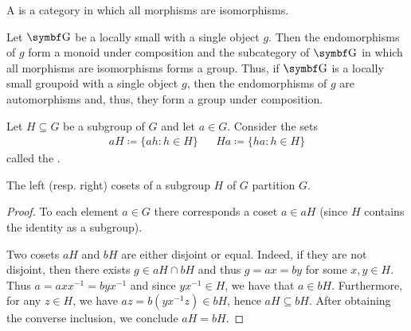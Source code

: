 \begin{definition}\label{def:groupoid}
  A  is a category in which all morphisms are isomorphisms.
\end{definition}

\begin{definition}\label{remark:groupoids}
  Let \( \Bold G \) be a locally small with a single object \( g \). Then the endomorphisms of \( g \) form a monoid under composition and the subcategory of \( \Bold G \) in which all morphisms are isomorphisms forms a group. Thus, if \( \Bold G \) is a locally small groupoid with a single object \( g \), then the endomorphisms of \( g \) are automorphisms and, thus, they form a group under composition.
\end{definition}

\begin{definition}\label{def:group_cosets}
  Let \( H \subseteq G \) be a subgroup of \( G \) and let \( a \in G \). Consider the sets
  \begin{align*}
    aH \coloneqq \{ ah \colon h \in H \}
    &&
    Ha \coloneqq \{ ha \colon h \in H \}
  \end{align*}
  called the .
\end{definition}

\begin{proposition}\label{thm:coset_partition}
  The left (resp. right) cosets of a subgroup \( H \) of \( G \) partition \( G \).
\end{proposition}
\begin{proof}
  To each element \( a \in G \) there corresponds a coset \( a \in aH \) (since \( H \) contains the identity as a subgroup).

  Two cosets \( aH \) and \( bH \) are either disjoint or equal. Indeed, if they are not disjoint, then there exists \( g \in aH \cap bH \) and thus \( g = ax = by \) for some \( x, y \in H \). Thus \( a = a x x^{-1} = b y x^{-1} \) and since \( y x^{-1} \in H \), we have that \( a \in bH \). Furthermore, for any \( z \in H \), we have \( az = b(y x^{-1} z) \in bH \), hence \( aH \subseteq bH \). After obtaining the converse inclusion, we conclude \( aH = bH \).
\end{proof}

